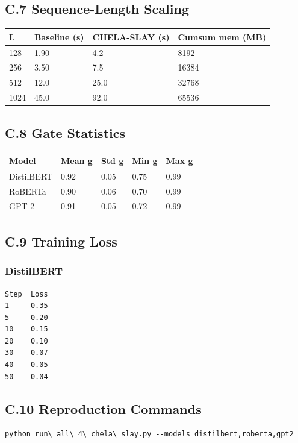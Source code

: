 \subsection{C.7 Sequence-Length Scaling}

\begin{table}[H]
\centering
\small
\begin{tabular}{llll}
\toprule
\textbf{L} & \textbf{Baseline (s)} & \textbf{CHELA-SLAY (s)} & \textbf{Cumsum mem (MB)} \\
\midrule
128 & 1.90 & 4.2 & 8192 \\
256 & 3.50 & 7.5 & 16384 \\
512 & 12.0 & 25.0 & 32768 \\
1024 & 45.0 & 92.0 & 65536 \\
\bottomrule
\end{tabular}
\end{table}

\subsection{C.8 Gate Statistics}

\begin{table}[H]
\centering
\small
\begin{tabular}{lllll}
\toprule
\textbf{Model} & \textbf{Mean g} & \textbf{Std g} & \textbf{Min g} & \textbf{Max g} \\
\midrule
DistilBERT & 0.92 & 0.05 & 0.75 & 0.99 \\
RoBERTa & 0.90 & 0.06 & 0.70 & 0.99 \\
GPT-2 & 0.91 & 0.05 & 0.72 & 0.99 \\
\bottomrule
\end{tabular}
\end{table}

\subsection{C.9 Training Loss}

\subsubsection{DistilBERT}
\begin{lstlisting}
Step  Loss
1     0.35
5     0.20
10    0.15
20    0.10
30    0.07
40    0.05
50    0.04
\end{lstlisting}

\subsection{C.10 Reproduction Commands}

\begin{lstlisting}
python run\_all\_4\_chela\_slay.py --models distilbert,roberta,gpt2
\end{lstlisting}

